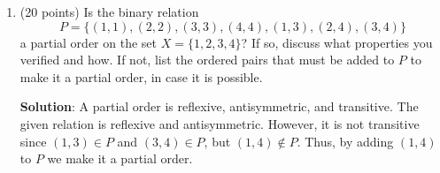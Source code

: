 \documentclass[12pt]{article}
\newenvironment{solution}{
\begin{mdframed}
  { {\bfseries Solution}: }}{
\end{mdframed}}
\begin{document}
\begin{enumerate}
\begin{solution}
\begin{figure}[H]
\begin{tikzpicture}
        \end{tikzpicture}

      \end{figure}
    \end{solution}

    \pagebreak

    \item (20 points) Is the binary relation
    \begin{equation*}
      P = \{(1, 1), (2, 2), (3, 3), (4, 4), (1, 3), (2, 4), (3, 4)\}
    \end{equation*}
    a partial order on the set \(X = \{1, 2, 3, 4\}\)? If so, discuss what properties you verified and how. If not, list the ordered pairs that must be added to \(P\) to make it a partial order, in case it is possible.

    \begin{solution}
      A partial order is reflexive, antisymmetric, and transitive. The given relation is reflexive and antisymmetric.
      However, it is not transitive since \((1, 3) \in P\) and \((3, 4) \in P\), but \((1, 4) \notin P\).
      Thus, by adding \((1, 4)\) to \(P\) we make it a partial order.
    \end{solution}
  \end{enumerate}
\end{document}
